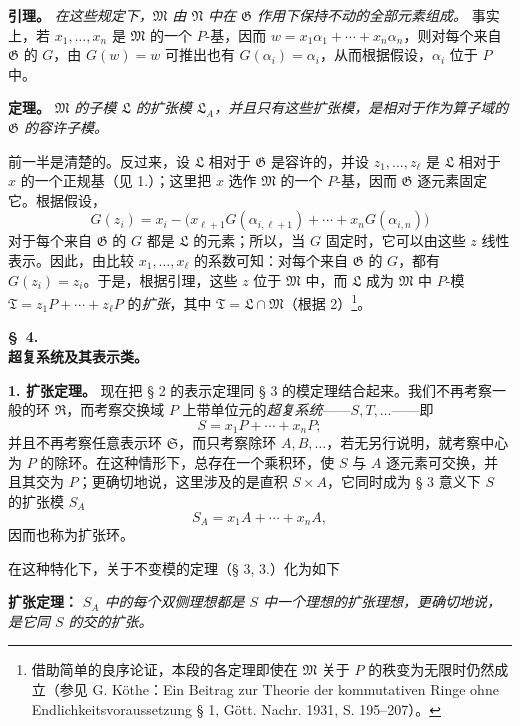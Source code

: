 \documentclass[11pt]{article}
\providecommand{\frR}{\mathfrak R}
\providecommand{\frS}{\mathfrak S}
\providecommand{\frT}{\mathfrak T}
\providecommand{\frM}{\mathfrak M}
\providecommand{\frN}{\mathfrak N}
\providecommand{\frG}{\mathfrak G}
\providecommand{\frL}{\mathfrak L}
\begin{document}
\noindent\textbf{引理。} \emph{在这些规定下，\(\frM\) 由 \(\frN\) 中在 \(\frG\) 作用下保持不动的全部元素组成。} 事实上，若 \(x_1,\ldots,x_n\) 是 \(\frM\) 的一个 \(P\)-基，因而 \(w=x_1\alpha_1+\cdots+x_n\alpha_n\)，则对每个来自 \(\frG\) 的 \(G\)，由 \(G(w)=w\) 可推出也有 \(G(\alpha_i)=\alpha_i\)，从而根据假设，\(\alpha_i\) 位于 \(P\) 中。

\noindent\textbf{定理。} \emph{\(\frM\) 的子模 \(\frL\) 的扩张模 \(\frL_A\)，并且只有这些扩张模，是相对于作为算子域的 \(\frG\) 的容许子模。}

前一半是清楚的。反过来，设 \(\frL\) 相对于 \(\frG\) 是容许的，并设 \(z_1,\ldots,z_\ell\) 是 \(\frL\) 相对于 \(x\) 的一个正规基（见 1.）；这里把 \(x\) 选作 \(\frM\) 的一个 \(P\)-基，因而 \(\frG\) 逐元素固定它。根据假设，
\[
        G(z_i)=x_i-\bigl(x_{\ell+1}G(\alpha_{i,\ell+1})
              +\cdots+x_nG(\alpha_{i,n})\bigr)
\]
对于每个来自 \(\frG\) 的 \(G\) 都是 \(\frL\) 的元素；所以，当 \(G\) 固定时，它可以由这些 \(z\) 线性表示。因此，由比较 \(x_1,\ldots,x_\ell\) 的系数可知：对每个来自 \(\frG\) 的 \(G\)，都有 \(G(z_i)=z_i\)。于是，根据引理，这些 \(z\) 位于 \(\frM\) 中，而 \(\frL\) 成为 \(\frM\) 中 \(P\)-模 \(\frT=z_1P+\cdots+z_\ell P\) 的\emph{扩张}，其中 \(\frT=\frL\cap\frM\)（根据 2）\footnote{借助简单的良序论证，本段的各定理即使在 \(\frM\) 关于 \(P\) 的秩变为无限时仍然成立（参见 G. Köthe：Ein Beitrag zur Theorie der kommutativen Ringe ohne Endlichkeitsvoraussetzung § 1, Gött. Nachr. 1931, S. 195--207）。}。

\begin{center}
\textbf{\S\ 4.}\\[0.5em]
\textbf{超复系统及其表示类。}
\end{center}

\noindent\textbf{1. 扩张定理。} 现在把 § 2 的表示定理同 § 3 的模定理结合起来。我们不再考察一般的环 \(\frR\)，而考察交换域 \(P\) 上带单位元的\emph{超复系统}——\(S,T,\ldots\)——即
\[
        S=x_1P+\cdots+x_nP;
\]
并且不再考察任意表示环 \(\frS\)，而只考察除环 \(A,B,\ldots\)，若无另行说明，就考察中心为 \(P\) 的除环。在这种情形下，总存在一个乘积环，使 \(S\) 与 \(A\) 逐元素可交换，并且其交为 \(P\)；更确切地说，这里涉及的是直积 \(S\times A\)，它同时成为 § 3 意义下 \(S\) 的扩张模 \(S_A\)
\[
        S_A=x_1A+\cdots+x_nA,
\]
因而也称为扩张环。

在这种特化下，关于不变模的定理（§ 3, 3.）化为如下

\noindent\textbf{扩张定理：} \emph{\(S_A\) 中的每个双侧理想都是 \(S\) 中一个理想的扩张理想，更确切地说，是它同 \(S\) 的交的扩张。}
\end{document}
